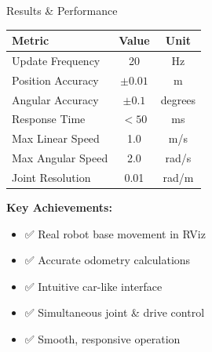 \documentclass[aspectratio=169]{beamer}
\begin{document}
\begin{frame}{Results \& Performance}
\begin{center}
\begin{tabular}{|l|c|c|}
\hline
\textbf{Metric} & \textbf{Value} & \textbf{Unit} \\
\hline\hline
Update Frequency & 20 & Hz \\
Position Accuracy & $\pm 0.01$ & m \\
Angular Accuracy & $\pm 0.1$ & degrees \\
Response Time & $< 50$ & ms \\
Max Linear Speed & 1.0 & m/s \\
Max Angular Speed & 2.0 & rad/s \\
Joint Resolution & 0.01 & rad/m \\
\hline
\end{tabular}
\end{center}

\vspace{1cm}

\textbf{Key Achievements:}
\begin{itemize}
    \item ✅ Real robot base movement in RViz
    \item ✅ Accurate odometry calculations  
    \item ✅ Intuitive car-like interface
    \item ✅ Simultaneous joint \& drive control
    \item ✅ Smooth, responsive operation
\end{itemize}
\end{frame}
\end{document}
